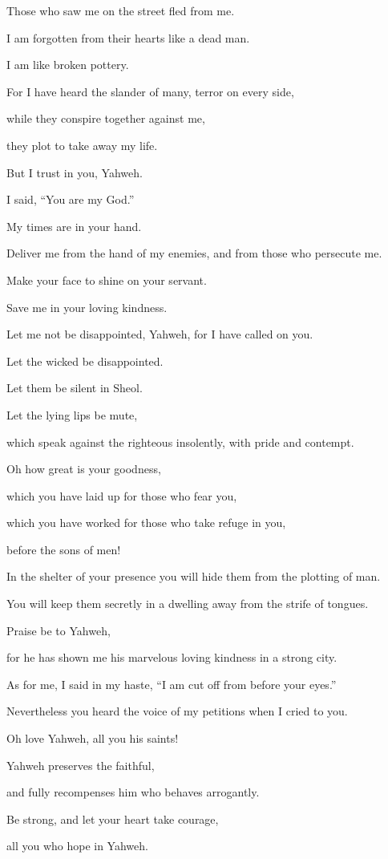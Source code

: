 {\par }{\QB Those who saw me on the street fled from me.
\par }{\Q {}I am forgotten from their hearts like a dead man.
\par }{\QB I am like broken pottery.
\par }{\Q {}For I have heard the slander of many, terror on every side,
\par }{\QB while they conspire together against me,
\par }{\QB they plot to take away my life.
\par }{\Q {}But I trust in you, Yahweh.
\par }{\QB I said, “You are my God.”
\par }{\Q {}My times are in your hand.
\par }{\QB Deliver me from the hand of my enemies, and from those who persecute me.
\par }{\Q {}Make your face to shine on your servant.
\par }{\QB Save me in your loving kindness.
\par }{\Q {}Let me not be disappointed, Yahweh, for I have called on you.
\par }{\QB Let the wicked be disappointed.
\par }{\QB Let them be silent in Sheol.
\par }{\Q {}Let the lying lips be mute,
\par }{\QB which speak against the righteous insolently, with pride and contempt.
\par }{\Q {}Oh how great is your goodness,
\par }{\QB which you have laid up for those who fear you,
\par }{\QB which you have worked for those who take refuge in you,
\par }{\QB before the sons of men!
\par }{\Q {}In the shelter of your presence you will hide them from the plotting of man.
\par }{\QB You will keep them secretly in a dwelling away from the strife of tongues.
\par }{\Q {}Praise be to Yahweh,
\par }{\QB for he has shown me his marvelous loving kindness in a strong city.
\par }{\Q {}As for me, I said in my haste, “I am cut off from before your eyes.”
\par }{\QB Nevertheless you heard the voice of my petitions when I cried to you.
\par }{\Q {}Oh love Yahweh, all you his saints!
\par }{\QB Yahweh preserves the faithful,
\par }{\Q and fully recompenses him who behaves arrogantly.
\par }{\Q {}Be strong, and let your heart take courage,
\par }{\QB all you who hope in Yahweh.

}

